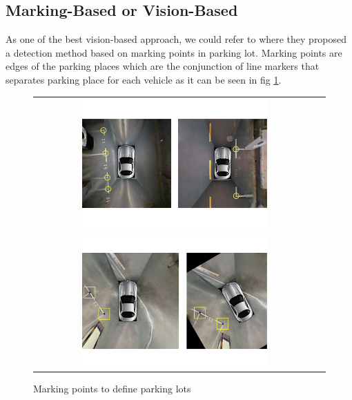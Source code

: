 \subsection{Marking-Based or Vision-Based}
As one of the best vision-based approach, we could refer to \cite{markingPointConf} where they proposed a detection method based on marking points in parking lot. Marking points are edges of the parking places which are the conjunction of line markers that separates parking place for each vehicle as it can be seen in fig \ref{fig:markingPoint}.
\begin{figure}
\centering
    \begin{tabular}{lc}
         \includegraphics[width=12cm, height=5cm]{images/markingPoint1.pdf} \\
         \includegraphics[width=12cm, height=5cm]{images/markingPoint2.pdf}
    \end{tabular}
    \caption{Marking points to define parking lots \cite{markingPointJournal}}
    \label{fig:markingPoint}
\end{figure}
